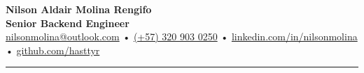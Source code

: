 \documentclass[10pt,letterpaper]{extarticle}
\begin{document}
	\begin{center}
		{\LARGE \textbf{Nilson Aldair Molina Rengifo}}\\[4pt]
		\textbf{Senior Backend Engineer}\\[6pt]
		\href{mailto:nilsonmolina@outlook.com}{nilsonmolina@outlook.com} •
		\href{https://wa.me/573209030250}{(+57) 320 903 0250} •
		\href{https://linkedin.com/in/nilsonmolina}{linkedin.com/in/nilsonmolina} •
		\href{https://github.com/hasttyr}{github.com/hasttyr}
	\end{center}

	\vspace{1em}
	\hrule
	\vspace{1em}

\end{document}
